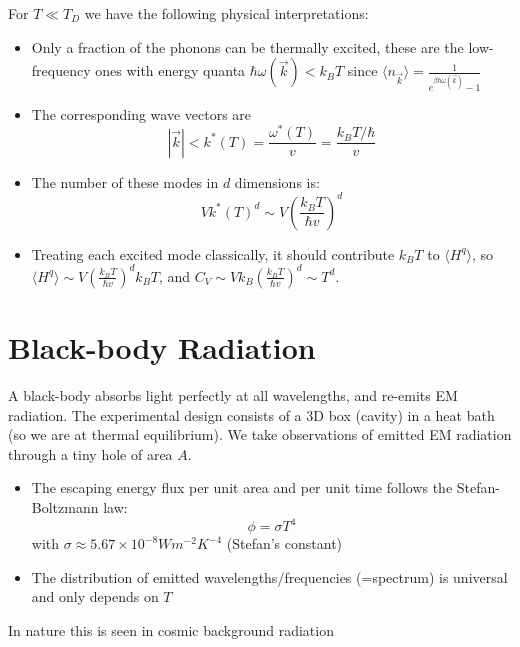 \documentclass[12pt, a4paper, oneside, openright, titlepage]{book}
\begin{document}
For $T \ll T_D$ we have the following physical interpretations: \begin{itemize}
    \item Only a fraction of the phonons can be thermally excited, these are the low-frequency ones with energy quanta $\hbar\omega(\vec{k}) < k_BT$ since $\langle n_{\vec{k}}\rangle = \frac{1}{e^{\beta\hbar\omega(\vec{k})}-1}$
    \item The corresponding wave vectors are \begin{equation*}
            |\vec{k}| < k^*(T) = \frac{\omega^*(T)}{v} = \frac{k_BT/\hbar}{v}
    \end{equation*}
    \item The number of these modes in $d$ dimensions is: \begin{equation*}
            Vk^*(T)^d\sim V\left(\frac{k_BT}{\hbar v}\right)^d
    \end{equation*}
    \item Treating each excited mode classically, it should contribute $k_BT$ to $\langle H^q\rangle$, so $\langle H^q\rangle \sim V\left(\frac{k_BT}{\hbar v}\right)^dk_BT$, and $C_V\sim Vk_B\left(\frac{k_BT}{\hbar v}\right)^d \sim T^d$.
\end{itemize}


\chapter{Black-body Radiation}

A black-body absorbs light perfectly at all wavelengths, and re-emits EM radiation. The experimental design consists of a 3D box (cavity) in a heat bath (so we are at thermal equilibrium). We take observations of emitted EM radiation through a tiny hole of area $A$.
\begin{itemize}
    \item The escaping energy flux per unit area and per unit time follows the Stefan-Boltzmann law: \begin{equation*}
            \phi = \sigma T^4
    \end{equation*}
        with $\sigma \approx 5.67\times 10^{-8}Wm^{-2}K^{-4}$ (Stefan's constant)
    \item The distribution of emitted wavelengths/frequencies (=spectrum) is universal and only depends on $T$
\end{itemize}
In nature this is seen in cosmic background radiation
\end{document}
